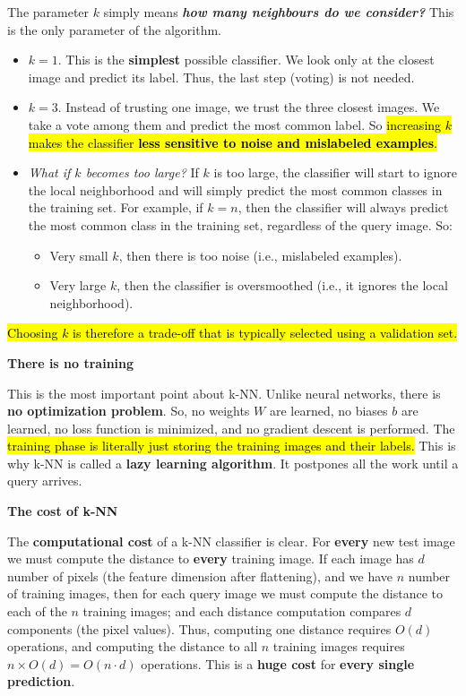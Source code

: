 The parameter $k$ simply means \textbf{\emph{how many neighbours do we consider?}} This is the only parameter of the algorithm.
\begin{itemize}
    \item $k=1$. This is the \textbf{simplest} possible classifier. We look only at the closest image and predict its label. Thus, the last step (voting) is not needed.


    \item $k=3$. Instead of trusting one image, we trust the three closest images. We take a vote among them and predict the most common label. So \hl{increasing $k$ makes the classifier \textbf{less sensitive to noise and mislabeled examples}.}


    \item \emph{What if $k$ becomes too large?} If $k$ is too large, the classifier will start to ignore the local neighborhood and will simply predict the most common classes in the training set. For example, if $k=n$, then the classifier will always predict the most common class in the training set, regardless of the query image. So:
    \begin{itemize}
        \item Very small $k$, then there is too noise (i.e., mislabeled examples).
        \item Very large $k$, then the classifier is oversmoothed (i.e., it ignores the local neighborhood).
    \end{itemize}
\end{itemize}
\hl{Choosing $k$ is therefore a trade-off that is typically selected using a validation set.}

\highspace
\begin{flushleft}
    \textcolor{Red2}{ \textbf{There is no training}}
\end{flushleft}
This is the most important point about k-NN. Unlike neural networks, there is \textbf{no optimization problem}. So, no weights $W$ are learned, no biases $b$ are learned, no loss function is minimized, and no gradient descent is performed. The \hl{training phase is literally just storing the training images and their labels.} This is why k-NN is called a \textbf{lazy learning algorithm}. It postpones all the work until a query arrives.

\highspace
\begin{flushleft}
    \textcolor{Red2}{ \textbf{The cost of k-NN}}
\end{flushleft}
The \textbf{computational cost} of a k-NN classifier is clear. For \textbf{every} new test image we must compute the distance to \textbf{every} training image. If each image has $d$ number of pixels (the feature dimension after flattening), and we have $n$ number of training images, then for each query image we must compute the distance to each of the $n$ training images; and each distance computation compares $d$ components (the pixel values). Thus, computing one distance requires $O(d)$ operations, and computing the distance to all $n$ training images requires $n \times O(d) = O(n \cdot d)$ operations. This is a \textbf{huge cost} for \textbf{every single prediction}.


